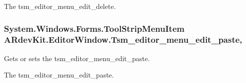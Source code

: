 The tsm\-\_\-editor\-\_\-menu\-\_\-edit\-\_\-delete. \hypertarget{class_a_rdev_kit_1_1_editor_window_ac2310f24fffc1c84b2c23c5e6cbd8156}{
\subsubsection[{Tsm\-\_\-editor\-\_\-menu\-\_\-edit\-\_\-paste}]{\setlength{\rightskip}{0pt plus 5cm}System.\-Windows.\-Forms.\-Tool\-Strip\-Menu\-Item A\-Rdev\-Kit.\-Editor\-Window.\-Tsm\-\_\-editor\-\_\-menu\-\_\-edit\-\_\-paste\hspace{0.3cm}{\ttfamily [get]}, {\ttfamily [set]}}}\label{class_a_rdev_kit_1_1_editor_window_ac2310f24fffc1c84b2c23c5e6cbd8156}


Gets or sets the tsm\-\_\-editor\-\_\-menu\-\_\-edit\-\_\-paste. 

The tsm\-\_\-editor\-\_\-menu\-\_\-edit\-\_\-paste. 